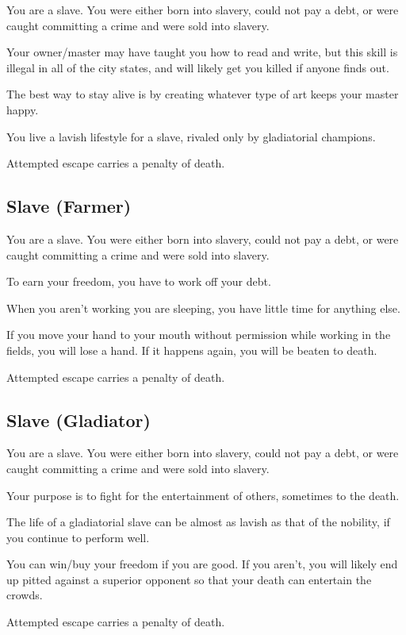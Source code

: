 \begin{multicols}{2}
\begin{description}
    \item You are a slave. You were either born into slavery, could not pay a debt, or were caught committing a crime and were sold into slavery.
    \item Your owner/master may have taught you how to read and write, but this skill is illegal in all of the city states, and will likely get you killed if anyone finds out.
    \item The best way to stay alive is by creating whatever type of art keeps your master happy.
    \item You live a lavish lifestyle for a slave, rivaled only by gladiatorial champions.
    \item Attempted escape carries a penalty of death.
\end{description}

\subsection{Slave (Farmer)}

\begin{description}
    \item You are a slave. You were either born into slavery, could not pay a debt, or were caught committing a crime and were sold into slavery.
    \item To earn your freedom, you have to work off your debt.
    \item When you aren’t working you are sleeping, you have little time for anything else.
    \item If you move your hand to your mouth without permission while working in the fields, you will lose a hand. If it happens again, you will be beaten to death.
    \item Attempted escape carries a penalty of death.
\end{description}

\subsection{Slave (Gladiator)}

\begin{description}
    \item You are a slave. You were either born into slavery, could not pay a debt, or were caught committing a crime and were sold into slavery.
    \item Your purpose is to fight for the entertainment of others, sometimes to the death.
    \item The life of a gladiatorial slave can be almost as lavish as that of the nobility, if you continue to perform well.
    \item You can win/buy your freedom if you are good. If you aren’t, you will likely end up pitted against a superior opponent so that your death can entertain the crowds.
    \item Attempted escape carries a penalty of death.
\end{description}


\end{multicols}
